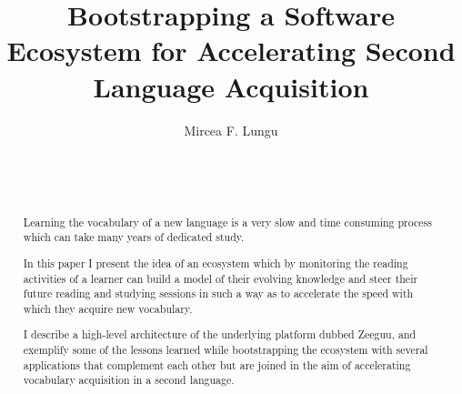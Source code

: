 \documentclass{sig-alternate-05-2015}
\begin{document}





\title{Bootstrapping a Software Ecosystem for Accelerating Second Language Acquisition}


\author{
Mircea F. Lungu \\
       \\
       \\
       \\
}


\maketitle
\begin{abstract}

Learning the vocabulary of a new language is a very slow and time consuming process which can take many years of dedicated study. 

In this paper I present the idea of an ecosystem which by monitoring the reading activities of a learner can build a model of their evolving knowledge and steer their future reading and studying sessions in such a way as to accelerate the speed with which they acquire new vocabulary. 

I describe a high-level architecture of the underlying platform dubbed Zeeguu, and exemplify some of the lessons learned while bootstrapping the ecosystem with several applications that complement each  other but are joined in the aim of accelerating vocabulary acquisition in a second language. 

\end{abstract}
\end{document}
